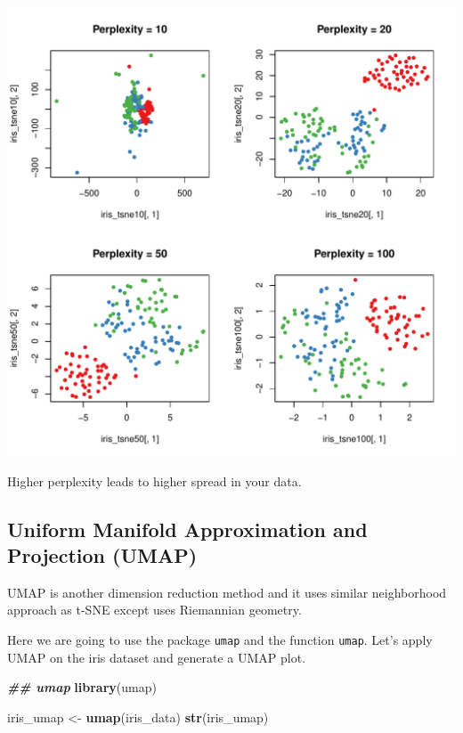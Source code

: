\documentclass[
]{book}
\newenvironment{Shaded}{\begin{snugshade}}{\end{snugshade}}
\newcommand{\DocumentationTok}[1]{\textcolor[rgb]{0.56,0.35,0.01}{\textbf{\textit{#1}}}}
\newcommand{\FunctionTok}[1]{\textcolor[rgb]{0.13,0.29,0.53}{\textbf{#1}}}
\newcommand{\NormalTok}[1]{#1}
\newcommand{\OtherTok}[1]{\textcolor[rgb]{0.56,0.35,0.01}{#1}}
\begin{document}
\includegraphics{_main_files/figure-latex/unnamed-chunk-54-1.pdf}

Higher perplexity leads to higher spread in your data.

\subsection{Uniform Manifold Approximation and Projection (UMAP)}\label{uniform-manifold-approximation-and-projection-umap}

UMAP is another dimension reduction method and it uses similar neighborhood approach as t-SNE except uses Riemannian geometry.

Here we are going to use the package \texttt{umap} and the function \texttt{umap}. Let's apply UMAP on the iris dataset and generate a UMAP plot.

\begin{Shaded}
\begin{Highlighting}[]
\DocumentationTok{\#\# umap}
\FunctionTok{library}\NormalTok{(umap)}

\NormalTok{iris\_umap }\OtherTok{\textless{}{-}} \FunctionTok{umap}\NormalTok{(iris\_data)}
\FunctionTok{str}\NormalTok{(iris\_umap)}
\end{Highlighting}
\end{Shaded}
\end{document}
